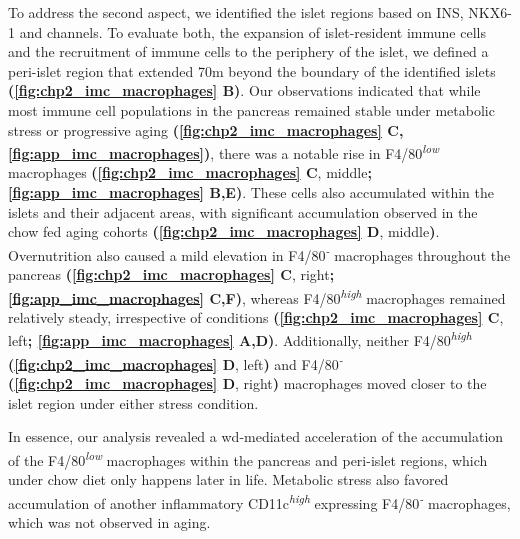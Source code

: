 To address the second aspect, we identified the islet regions based on INS, NKX6-1 and  channels. To evaluate both, the expansion of islet-resident immune cells and the recruitment of immune cells to the periphery of the islet, we defined a peri-islet region that extended 70\textmu m beyond the boundary of the identified islets \textbf{(\autoref{fig:chp2_imc_macrophages} B)}. Our observations indicated that while most immune cell populations in the pancreas remained stable under metabolic stress or progressive aging \textbf{(\autoref{fig:chp2_imc_macrophages} C, \autoref{fig:app_imc_macrophages})}, there was a notable rise in F4/80\textsuperscript{\textit{low}} macrophages \textbf{(\autoref{fig:chp2_imc_macrophages} C}, middle\textbf{; \autoref{fig:app_imc_macrophages} B,E)}. These cells also accumulated within the islets and their adjacent areas, with significant accumulation observed in the chow fed aging cohorts \textbf{(\autoref{fig:chp2_imc_macrophages} D}, middle\textbf{)}. Overnutrition also caused a mild elevation in F4/80\textsuperscript{\textit{-}} macrophages throughout the pancreas \textbf{(\autoref{fig:chp2_imc_macrophages} C}, right\textbf{; \autoref{fig:app_imc_macrophages} C,F)}, whereas F4/80\textsuperscript{\textit{high}} macrophages remained relatively steady, irrespective of conditions \textbf{(\autoref{fig:chp2_imc_macrophages} C}, left\textbf{; \autoref{fig:app_imc_macrophages} A,D)}. Additionally, neither F4/80\textsuperscript{\textit{high}} \textbf{(\autoref{fig:chp2_imc_macrophages} D}, left\textbf{)}  and F4/80\textsuperscript{\textit{-}} \textbf{(\autoref{fig:chp2_imc_macrophages} D}, right\textbf{)} macrophages moved closer to the islet region under either stress condition.\\

\par In essence, our analysis revealed a \gls{wd}-mediated acceleration of the accumulation of the F4/80\textsuperscript{\textit{low}} macrophages within the pancreas and peri-islet regions, which under chow diet only happens later in life. Metabolic stress also favored accumulation of another inflammatory CD11c\textsuperscript{\textit{high}} expressing F4/80\textsuperscript{\textit{-}} macrophages, which was not observed in aging.


